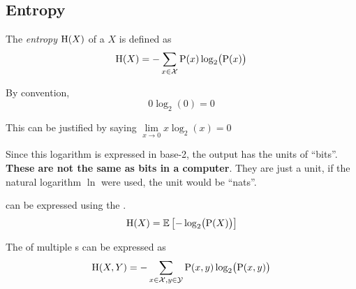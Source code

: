\subsection{Entropy}\label{subsec:Entropy}
\begin{definition}[Entropy]\label{def:Entropy}
  The \emph{entropy} $\operatorname{\operatorname{H}}(X)$ of a  $X$ is defined as
  \begin{equation}\label{eq:Entropy}
    \operatorname{\operatorname{H}}(X) = - \sum\limits_{x \in \mathcal{X}} \operatorname{\operatorname{P}}(x) \log_{2}\bigl( \operatorname{\operatorname{P}}(x) \bigr)
  \end{equation}

  \begin{remark}[Probability is 0]\label{rmk:Entropy_Probability_0}
    By convention,
    \begin{equation}\label{eq:Entropy_Probability_0}
      0 \log_{2} (0) = 0
    \end{equation}

    This can be justified by saying $\lim\limits_{x \rightarrow 0} x \log_{2}(x) = 0$
  \end{remark}

  \begin{remark}\label{rmk:Entropy_Bits}
    Since this logarithm is expressed in base-2, the output has the units of ``bits''.
    \textbf{These are not the same as bits in a computer}.
    They are just a unit, if the natural logarithm $\ln$ were used, the unit would be ``nats''.
  \end{remark}

   can be expressed using the .
  \begin{equation}\label{eq:Entropy-Expected_Value}
    \operatorname{\operatorname{H}}(X) = \operatorname{\operatorname{\mathbb{E}}} \left[ - \log_{2}\bigl( \operatorname{\operatorname{P}}(X) \bigr) \right]
  \end{equation}

  The  of multiple s can be expressed as
  \begin{equation}\label{eq:Entropy-Multiple_Discrete_Random_Variables}
    \operatorname{\operatorname{H}}(X,Y) = - \sum\limits_{x \in \mathcal{X}, y \in \mathcal{Y}} \operatorname{\operatorname{P}}(x, y) \log_{2} \bigl( \operatorname{\operatorname{P}}(x, y) \bigr)
  \end{equation}
\end{definition}

